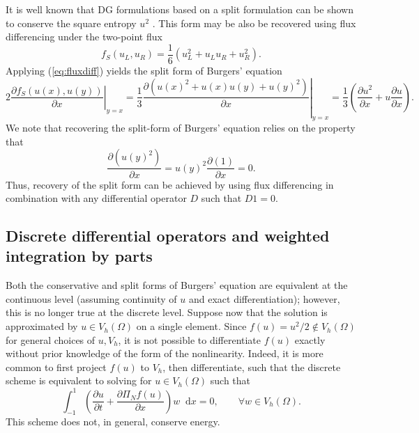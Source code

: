 \documentclass[preprint,10pt]{article}
\theoremstyle{definition}
\theoremstyle{lemma}
\theoremstyle{theorem}
\theoremstyle{assumption}
\newcommand{\pd}[2]{\frac{\partial#1}{\partial#2}}
\newcommand{\LRp}[1]{\left( #1 \right)}
\newcommand{\note}[1]{{\color{blue}{#1}}}
\newcommand*\diff[1]{\mathop{}\!{\mathrm{d}#1}}
\begin{document}
It is well known that DG formulations based on a split formulation can be shown to conserve the square entropy $u^2$ \cite{gassner2013skew, ranocha2017extended}.  This form may be also be recovered using flux differencing under the two-point flux
\[
f_S(u_L,u_R) = \frac{1}{6}(u_L^2 + u_Lu_R + u_R^2).
\]
Applying (\ref{eq:fluxdiff}) yields the split form of Burgers' equation
\[
2\left.\pd{f_S(u(x),u(y))}{x}\right|_{y=x} = \frac{1}{3}\left.\pd{\LRp{u(x)^2 + u(x)u(y) + u(y)^2}}{x}\right|_{y=x} = \frac{1}{3}\LRp{\pd{u^2}{x} + u\pd{u}{x}}.
\]
We note that recovering the split-form of Burgers' equation relies on the property
that 
\[
\pd{\LRp{u(y)^2}}{x} = u(y)^2\pd{\LRp{1}}{x} = 0.  
\]
Thus, recovery of the split form can be achieved by using flux differencing in combination with any differential operator $D$ such that $D1 = 0$.  

\subsection{Discrete differential operators and weighted integration by parts}

Both the conservative and split forms of Burgers' equation are equivalent at the continuous level (assuming continuity of $u$ and exact differentiation); however, this is no longer true at the discrete level.  Suppose now that the solution is approximated by $u \in V_h(\Omega)$ on a single element.  Since $f(u) = u^2/2 \not\in V_h(\Omega)$ for general choices of $u, V_h$, it is not possible to differentiate $f(u)$ exactly without prior knowledge of the form of the nonlinearity.  Indeed, it is more common to first project $f(u)$ to $V_h$, then differentiate, such that the discrete scheme is equivalent to solving for $u \in V_h(\Omega)$ such that
\[
\int_{-1}^1 \LRp{\pd{u}{t} + \pd{\Pi_N f(u)}{x}}w \diff{x}  
=0, \qquad \forall w \in V_h(\Omega).  
\]
This scheme does not, in general, conserve energy.  %
\end{document}
